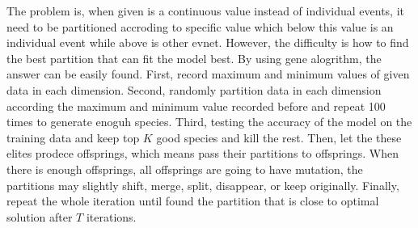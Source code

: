 \documentclass[twocolumn,10pt]{article}
\begin{document}
  The problem is, when given is a continuous value instead of individual events, it need to be partitioned accroding to specific value 
  which below this value is an individual event while above is other evnet. However, the difficulty is how to find the best partition 
  that can fit the model best. By using gene alogrithm, the answer can be easily found. First, record maximum and minimum values of 
  given data in each dimension. Second, randomly partition data in each dimension according the maximum and minimum value recorded before 
  and repeat 100 times to generate enoguh species. Third, testing the accuracy of the model on the training data and keep top $K$ 
  good species and kill the rest. Then, let the these elites prodece offsprings, which means pass their partitions to offsprings. 
  When there is enough offsprings, all offsprings are going to have mutation, the partitions may slightly shift, 
  merge, split, disappear, or keep originally. Finally, repeat the whole iteration until found the partition that is close to optimal 
  solution after $T$ iterations.
\end{document}
